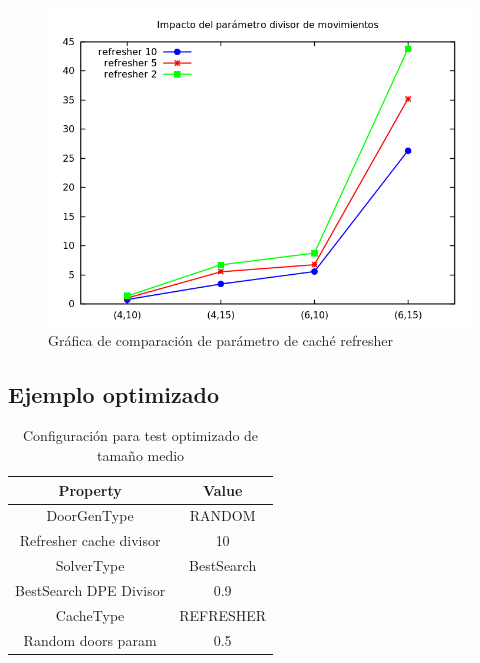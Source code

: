 \begin{figure}[H]
\centering
\includegraphics[scale=0.5]{img/refresher}
\caption{Gráfica de comparación de parámetro de caché refresher
\label{fig:grfrefresher}}
\end{figure}



\subsection{Ejemplo optimizado}

\begin{table}[H]
\begin{center}
	\begin{tabular}{ | c | c | }
\hline
 		Property & Value \\ \hline
DoorGenType & RANDOM \\ 
Refresher cache divisor & 10 \\ 
SolverType & BestSearch \\ 
BestSearch DPE Divisor & 0.9 \\ 
CacheType & REFRESHER \\ 
Random doors param & 0.5 \\ 
\hline
	\end{tabular}
\end{center}
\caption{Configuración para test optimizado de tamaño medio}
\label{table:cfg-bsoptmedsamp}
\end{table}

